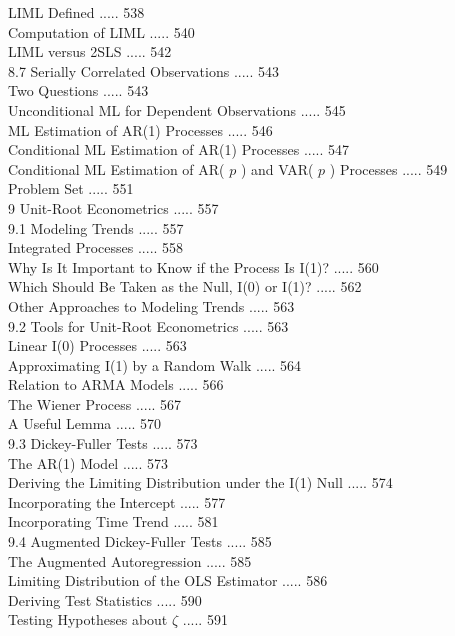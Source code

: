 \documentclass[10pt]{article}
\begin{document}
LIML Defined ..... 538\\
Computation of LIML ..... 540\\
LIML versus 2SLS ..... 542\\
8.7 Serially Correlated Observations ..... 543\\
Two Questions ..... 543\\
Unconditional ML for Dependent Observations ..... 545\\
ML Estimation of AR(1) Processes ..... 546\\
Conditional ML Estimation of AR(1) Processes ..... 547\\
Conditional ML Estimation of AR( $p$ ) and VAR( $p$ ) Processes ..... 549\\
Problem Set ..... 551\\
9 Unit-Root Econometrics ..... 557\\
9.1 Modeling Trends ..... 557\\
Integrated Processes ..... 558\\
Why Is It Important to Know if the Process Is I(1)? ..... 560\\
Which Should Be Taken as the Null, I(0) or I(1)? ..... 562\\
Other Approaches to Modeling Trends ..... 563\\
9.2 Tools for Unit-Root Econometrics ..... 563\\
Linear I(0) Processes ..... 563\\
Approximating I(1) by a Random Walk ..... 564\\
Relation to ARMA Models ..... 566\\
The Wiener Process ..... 567\\
A Useful Lemma ..... 570\\
9.3 Dickey-Fuller Tests ..... 573\\
The AR(1) Model ..... 573\\
Deriving the Limiting Distribution under the I(1) Null ..... 574\\
Incorporating the Intercept ..... 577\\
Incorporating Time Trend ..... 581\\
9.4 Augmented Dickey-Fuller Tests ..... 585\\
The Augmented Autoregression ..... 585\\
Limiting Distribution of the OLS Estimator ..... 586\\
Deriving Test Statistics ..... 590\\
Testing Hypotheses about $\zeta$ ..... 591\\
\end{document}
